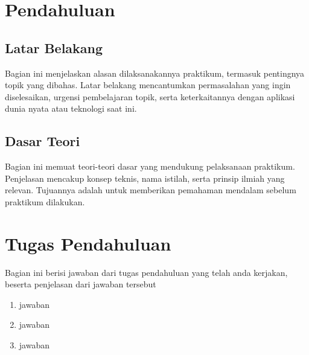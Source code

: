 \section{Pendahuluan}
\subsection{Latar Belakang}
Bagian ini menjelaskan alasan dilaksanakannya praktikum, termasuk pentingnya topik yang dibahas. Latar belakang mencantumkan permasalahan yang ingin diselesaikan, urgensi pembelajaran topik, serta keterkaitannya dengan aplikasi dunia nyata atau teknologi saat ini.

\subsection{Dasar Teori}
Bagian ini memuat teori-teori dasar yang mendukung pelaksanaan praktikum. Penjelasan mencakup konsep teknis, nama istilah, serta prinsip ilmiah yang relevan. Tujuannya adalah untuk memberikan pemahaman mendalam sebelum praktikum dilakukan.

\section{Tugas Pendahuluan}
Bagian ini berisi jawaban dari tugas pendahuluan yang telah anda kerjakan, beserta penjelasan dari jawaban tersebut
\begin{enumerate}
	\item jawaban
	\item jawaban
	\item jawaban
\end{enumerate}
